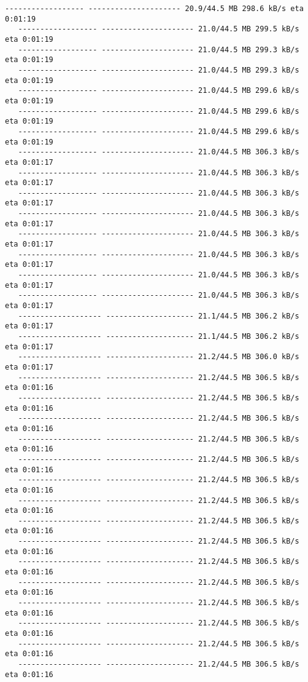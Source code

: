 \documentclass[11pt]{article}
\begin{document}
\begin{Verbatim}[commandchars=\\\{\}]
   ------------------ --------------------- 20.9/44.5 MB 298.6 kB/s eta 0:01:19
   ------------------ --------------------- 21.0/44.5 MB 299.5 kB/s eta 0:01:19
   ------------------ --------------------- 21.0/44.5 MB 299.3 kB/s eta 0:01:19
   ------------------ --------------------- 21.0/44.5 MB 299.3 kB/s eta 0:01:19
   ------------------ --------------------- 21.0/44.5 MB 299.6 kB/s eta 0:01:19
   ------------------ --------------------- 21.0/44.5 MB 299.6 kB/s eta 0:01:19
   ------------------ --------------------- 21.0/44.5 MB 299.6 kB/s eta 0:01:19
   ------------------ --------------------- 21.0/44.5 MB 306.3 kB/s eta 0:01:17
   ------------------ --------------------- 21.0/44.5 MB 306.3 kB/s eta 0:01:17
   ------------------ --------------------- 21.0/44.5 MB 306.3 kB/s eta 0:01:17
   ------------------ --------------------- 21.0/44.5 MB 306.3 kB/s eta 0:01:17
   ------------------ --------------------- 21.0/44.5 MB 306.3 kB/s eta 0:01:17
   ------------------ --------------------- 21.0/44.5 MB 306.3 kB/s eta 0:01:17
   ------------------ --------------------- 21.0/44.5 MB 306.3 kB/s eta 0:01:17
   ------------------ --------------------- 21.0/44.5 MB 306.3 kB/s eta 0:01:17
   ------------------- -------------------- 21.1/44.5 MB 306.2 kB/s eta 0:01:17
   ------------------- -------------------- 21.1/44.5 MB 306.2 kB/s eta 0:01:17
   ------------------- -------------------- 21.2/44.5 MB 306.0 kB/s eta 0:01:17
   ------------------- -------------------- 21.2/44.5 MB 306.5 kB/s eta 0:01:16
   ------------------- -------------------- 21.2/44.5 MB 306.5 kB/s eta 0:01:16
   ------------------- -------------------- 21.2/44.5 MB 306.5 kB/s eta 0:01:16
   ------------------- -------------------- 21.2/44.5 MB 306.5 kB/s eta 0:01:16
   ------------------- -------------------- 21.2/44.5 MB 306.5 kB/s eta 0:01:16
   ------------------- -------------------- 21.2/44.5 MB 306.5 kB/s eta 0:01:16
   ------------------- -------------------- 21.2/44.5 MB 306.5 kB/s eta 0:01:16
   ------------------- -------------------- 21.2/44.5 MB 306.5 kB/s eta 0:01:16
   ------------------- -------------------- 21.2/44.5 MB 306.5 kB/s eta 0:01:16
   ------------------- -------------------- 21.2/44.5 MB 306.5 kB/s eta 0:01:16
   ------------------- -------------------- 21.2/44.5 MB 306.5 kB/s eta 0:01:16
   ------------------- -------------------- 21.2/44.5 MB 306.5 kB/s eta 0:01:16
   ------------------- -------------------- 21.2/44.5 MB 306.5 kB/s eta 0:01:16
   ------------------- -------------------- 21.2/44.5 MB 306.5 kB/s eta 0:01:16
   ------------------- -------------------- 21.2/44.5 MB 306.5 kB/s eta 0:01:16

\end{Verbatim}
\end{document}
